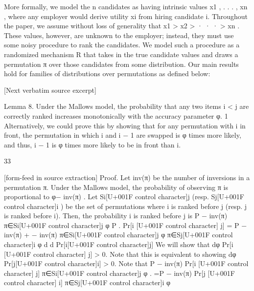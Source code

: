 \documentclass[10pt]{article}
\begin{document}
\begin{ReviewVerbatim}
More formally, we model the n candidates as having intrinsic values x1 , . . . , xn , where any employer would
derive utility xi from hiring candidate i. Throughout the paper, we assume without loss of generality that
x1 > x2 > · · · > xn . These values, however, are unknown to the employer; instead, they must use some
noisy procedure to rank the candidates. We model such a procedure as a randomized mechanism R that
takes in the true candidate values and draws a permutation π over those candidates from some distribution.
Our main results hold for families of distributions over permutations as defined below:

[Next verbatim source excerpt]

Lemma 8. Under the Mallows model, the probability that any two items i < j are correctly ranked increases
monotonically with the accuracy parameter φ.
1 Alternatively, we could prove this by showing that for any permutation with i in front, the permutation in which i and i − 1
are swapped is φ times more likely, and thus, i − 1 is φ times more likely to be in front than i.

33


[form-feed in source extraction]
Proof. Let inv(π) be the number of inversions in a permutation π. Under the Mallows model, the probability
of observing π is proportional to φ− inv(π) . Let Si[U+001F control character]j (resp. Sj[U+001F control character]i ) be the set of permutations where i is ranked
before j (resp. j is ranked before i). Then, the probability i is ranked before j is
P
− inv(π)
π∈Si[U+001F control character]j φ
P
.
Pr[i [U+001F control character] j] = P
− inv(π) +
− inv(π)
π∈Si[U+001F control character]j φ
π∈Sj[U+001F control character]i φ
d
d Pr[i[U+001F control character]j]
We will show that dφ
Pr[i [U+001F control character] j] > 0. Note that this is equivalent to showing dφ
Pr[j[U+001F control character]i] > 0. Note that
P
− inv(π)
Pr[i [U+001F control character] j]
π∈Si[U+001F control character]j φ
.
=P
− inv(π)
Pr[j [U+001F control character] i]
π∈Sj[U+001F control character]i φ


\end{ReviewVerbatim}
\end{document}

